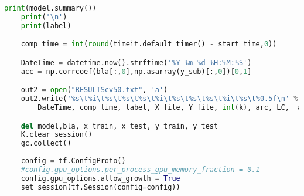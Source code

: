 \begin{lstlisting}[language=Python]
    print(model.summary())
    print('\n')
    print(label)        

    comp_time = int(round(timeit.default_timer() - start_time,0))

    DateTime = datetime.now().strftime('%Y-%m-%d %H:%M:%S')
    acc = np.corrcoef(bla[:,0],np.asarray(y_sub)[:,0])[0,1]

    out2 = open("RESULTScv50.txt", 'a')
    out2.write('%s\t%i\t%s\t%s\t%s\t%i\t%s\t%s\t%s\t%i\t%s\t%0.5f\n' % (
        DateTime, comp_time, label, X_file, Y_file, int(k), arc, LC,  act,int(training_epochs), drop_rate, round(acc,4)))

    del model,bla, x_train, x_test, y_train, y_test 
    K.clear_session() 
    gc.collect()
    
    config = tf.ConfigProto()
    #config.gpu_options.per_process_gpu_memory_fraction = 0.1
    config.gpu_options.allow_growth = True
    set_session(tf.Session(config=config))
\end{lstlisting}

